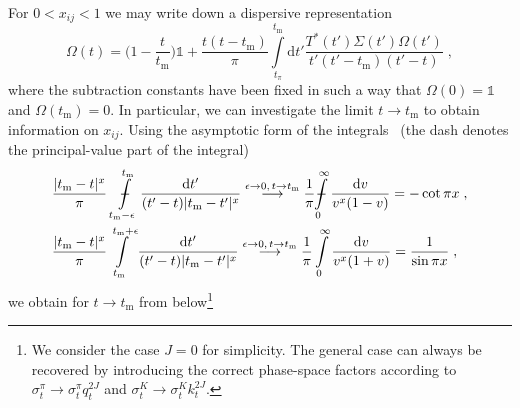 \documentclass[11pt]{article}%
\def\Xint#1{\mathchoice
   {\XXint\displaystyle\textstyle{#1}}%
   {\XXint\textstyle\scriptstyle{#1}}%
   {\XXint\scriptstyle\scriptscriptstyle{#1}}%
   {\XXint\scriptscriptstyle\scriptscriptstyle{#1}}%
   \!\int}
\def\XXint#1#2#3{{\setbox0=\hbox{$#1{#2#3}{\int}$}
     \vcenter{\hbox{$#2#3$}}\kern-0.5\wd0}}
\providecommand{\dashint}[1][0pt]{\Xint{\hspace{#1}-}}%
\providecommand{\ec}{\;,}
\providecommand{\nt}{\notag}
\newcommand{\diff}{\text{d}}
\newcommand{\mpi}{M_{\pi}}
\newcommand{\unity}{\mathds{1}}
\newcommand{\tpi}{t_\pi}
\newcommand{\tm}{t_\text{m}}
\newcommand{\beq}{\begin{equation}}
\newcommand{\eeq}{\end{equation}}
\newcommand{\eps}{\epsilon}
\providecommand{\unity}{\mathds{1}}
\begin{document}
For $0<x_{ij}<1$ we may write down a dispersive representation
\beq
\Omega(t)=\Big(1-\frac{t}{\tm}\Big)\unity+\frac{t(t-\tm)}{\pi}\int\limits_{\tpi}^{\tm}\diff t'\frac{T^*(t')\Sigma(t')\Omega(t')}{t'(t'-\tm)(t'-t)}\ec
\eeq
where the subtraction constants have been fixed in such a way that $\Omega(0)=\unity$ and $\Omega(\tm)=0$.
In particular, we can investigate the limit $t\to\tm$ to obtain information on $x_{ij}$. Using the asymptotic form of the integrals~\cite{BDM04} (the dash denotes the principal-value part of the integral)
\begin{align}
\label{integrals}
&\frac{|\tm-t|^{x}}{\pi}\dashint[9pt]\limits_{\tm-\eps}^{\tm}\frac{\diff t'}{(t'-t)|\tm-t'|^x}
\overset{\eps\to 0,\,t\to\tm}{\longrightarrow}\frac{1}{\pi}\dashint[0.5pt]\limits_0^\infty\frac{\diff v}{v^x(1-v)}=-\cot\pi x\ec\nt\\
%
&\frac{|\tm-t|^{x}}{\pi}\int\limits_{\tm}^{\tm+\eps}\frac{\diff t'}{(t'-t)|\tm-t'|^x}
\overset{\eps\to 0,\,t\to\tm}{\longrightarrow}\frac{1}{\pi}\int\limits_0^\infty\frac{\diff v}{v^x(1+v)}=\frac{1}{\sin \pi x}\ec
\end{align}
we obtain for $t\to\tm$ from below\footnote{We consider the case $J=0$ for simplicity. The general case can always be recovered by introducing the correct phase-space factors according to $\sigma_t^\pi\to \sigma_t^\pi q_t^{2J}$ and $\sigma_t^K\to \sigma_t^K k_t^{2J}$.}
\end{document}
